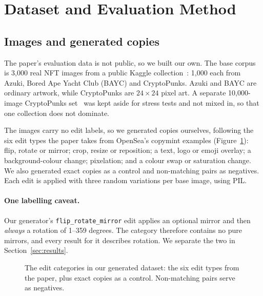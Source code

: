 \section{Dataset and Evaluation Method}
\label{sec:method}

\subsection{Images and generated copies}

The paper's evaluation data is not public, so we built our own. The base corpus is 3,000 real
NFT images from a public Kaggle collection~\cite{kaggle_nft}: 1,000 each from Azuki, Bored Ape
Yacht Club (BAYC) and CryptoPunks. Azuki and BAYC are ordinary artwork, while CryptoPunks are
$24\times24$ pixel art. A separate 10,000-image CryptoPunks set~\cite{kaggle_punks} was kept
aside for stress tests and not mixed in, so that one collection does not dominate.

The images carry no edit labels, so we generated copies ourselves, following the six edit
types the paper takes from OpenSea's copymint examples (Figure~\ref{fig:edits}): flip,
rotate or mirror; crop, resize or reposition; a text, logo or emoji overlay; a
background-colour change; pixelation; and a colour swap or saturation change. We also generated exact copies as a control and
non-matching pairs as negatives. Each edit is applied with three random variations per base
image, using PIL.

\paragraph{One labelling caveat.} Our generator's \texttt{flip\_rotate\_mirror} edit applies an
optional mirror and then \emph{always} a rotation of 1--359 degrees. The category therefore
contains no pure mirrors, and every result for it describes rotation. We separate the two
in Section~\ref{sec:results}.

\begin{figure}[ht]
\centering
{}
\caption{The edit categories in our generated dataset: the six edit types from the paper, plus
exact copies as a control. Non-matching pairs serve as negatives.}
\label{fig:edits}
\end{figure}

